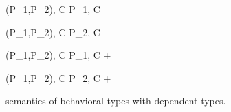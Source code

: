 \begin{figure*}
\begin{minipage}{\textwidth}
\begin{minipage}{0.5\textwidth}
{ \langle \Sirx (P_1,P_2), C \rangle \rightarrow \langle P_1, C \rangle }
\end{minipage}
\begin{minipage}{0.5\textwidth}
{ \langle \Sirx (P_1,P_2), C \rangle \rightarrow \langle P_2, C \rangle }
\end{minipage}

{ \langle \Sirx (P_1,P_2), C \rangle \xlongrightarrow{\snull} \langle P_1, C + \snull \rangle }

{ \langle \Sirx (P_1,P_2), C \rangle \xlongrightarrow{\snnull} \langle P_2, C + \snnull \rangle }





 



\end{minipage}
\caption{semantics of behavioral types with dependent types.}
\label{fig:bdRules}
\end{figure*}


